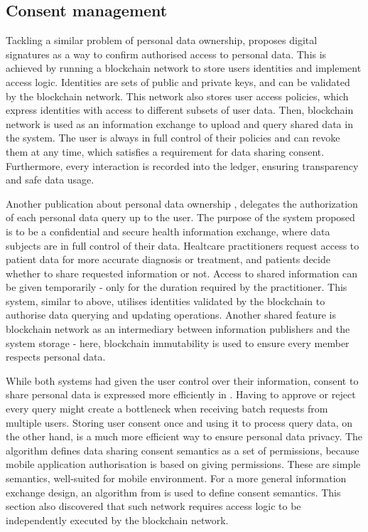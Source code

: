 \documentclass[12pt]{article}
\begin{document}
    \subsection{Consent management}
    Tackling a similar problem of personal data ownership, \cite{privacy} proposes digital signatures as a way to confirm authorised access to personal data. This is achieved by running a blockchain network to store users identities and implement access logic. Identities are sets of public and private keys, and can be validated by the blockchain network. This network also stores user access policies, which express identities with access to different subsets of user data. Then, blockchain network is used as an information exchange to upload and query shared data in the system. The user is always in full control of their policies and can revoke them at any time, which satisfies a requirement for data sharing consent. Furthermore, every interaction is recorded into the ledger, ensuring transparency and safe data usage.

    Another publication about personal data ownership \cite{gateways}, delegates the authorization of each personal data query up to the user. The purpose of the system proposed is to be a confidential and secure health information exchange, where data subjects are in full control of their data. Healtcare practitioners request access to patient data for more accurate diagnosis or treatment, and patients decide whether to share requested information or not. Access to shared information can be given temporarily - only for the duration required by the practitioner. This system, similar to above, utilises identities validated by the blockchain to authorise data querying and updating operations. Another shared feature is blockchain network as an intermediary between information publishers and the system storage - here, blockchain immutability is used to ensure every member respects personal data.

    While both systems had given the user control over their information, consent to share personal data is expressed more efficiently in \cite{privacy}. Having to approve or reject every query might create a bottleneck when receiving batch requests from multiple users. Storing user consent once and using it to process query data, on the other hand, is a much more efficient way to ensure personal data privacy. The algorithm defines data sharing consent semantics as a set of permissions, because mobile application authorisation is based on giving permissions. These are simple semantics, well-suited for mobile environment. For a more general information exchange design, an algorithm from \cite{konstantinidis} is used to define consent semantics. This section also discovered that such network requires access logic to be independently executed by the blockchain network. 
    
\end{document}
